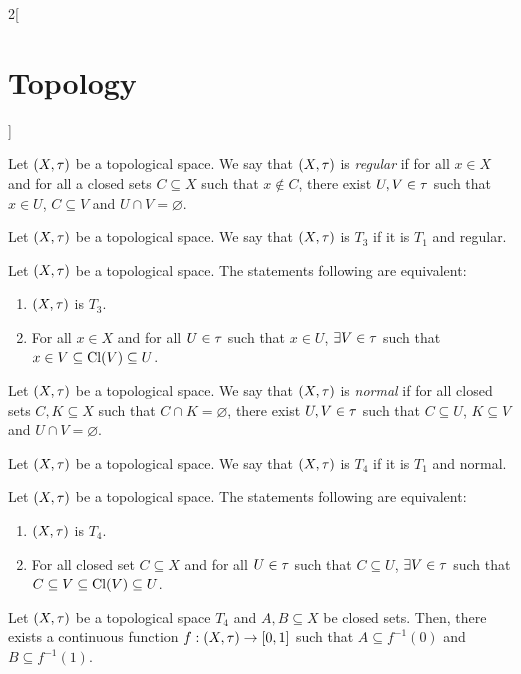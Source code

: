 \documentclass[../../../main.tex]{subfiles}
\begin{document}
\begin{multicols}{2}[\section{Topology}]
\begin{definition}
    Let $(X,\tau)$ be a topological space. We say that $(X,\tau)$ is \textit{regular} if for all $x\in X$ and for all a closed sets $C\subseteq X$ such that $x\notin C$, there exist $U,V\in\tau$ such that $x\in U$, $C\subseteq V$ and $U\cap V=\varnothing$.
  \end{definition}
  \begin{definition}[$T_3$ space]
    Let $(X,\tau)$ be a topological space. We say that $(X,\tau)$ is $T_3$ if it is $T_1$ and regular.
  \end{definition}
  \begin{theorem}
    Let $(X,\tau)$ be a topological space. The statements following are equivalent:
    \begin{enumerate}
      \item $(X,\tau)$ is $T_3$.
      \item For all $x\in X$ and for all $U\in\tau$ such that $x\in U$, $\exists V\in\tau$ such that $x\in V\subseteq\operatorname{Cl}(V)\subseteq U$.
    \end{enumerate}
  \end{theorem}
  \begin{definition}
    Let $(X,\tau)$ be a topological space. We say that $(X,\tau)$ is \textit{normal} if for all closed sets $C,K\subseteq X$ such that $C\cap K=\varnothing$, there exist $U,V\in\tau$ such that $C\subseteq U$, $K\subseteq V$ and $U\cap V=\varnothing$.
  \end{definition}
  \begin{definition}[$T_4$ space]
    Let $(X,\tau)$ be a topological space. We say that $(X,\tau)$ is $T_4$ if it is $T_1$ and normal.
  \end{definition}
  \begin{theorem}
    Let $(X,\tau)$ be a topological space. The statements following are equivalent:
    \begin{enumerate}
      \item $(X,\tau)$ is $T_4$.
      \item For all closed set $C\subseteq X$ and for all $U\in\tau$ such that $C\subseteq U$, $\exists V\in\tau$ such that $C\subseteq V\subseteq\operatorname{Cl}(V)\subseteq U$.
    \end{enumerate}
  \end{theorem}
  \begin{lemma}
    Let $(X,\tau)$ be a topological space $T_4$ and $A,B\subseteq X$ be closed sets. Then, there exists a continuous function $f:(X,\tau)\rightarrow[0,1]$ such that $A\subseteq f^{-1}(0)$ and $B\subseteq f^{-1}(1)$.

\end{lemma}
\end{multicols}
\end{document}
